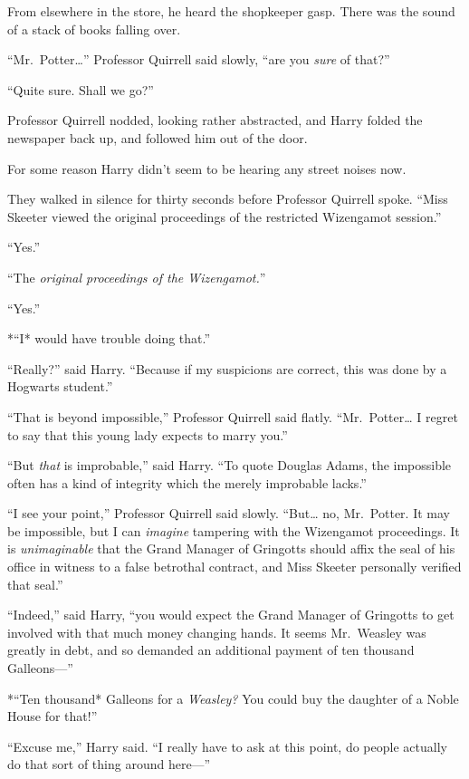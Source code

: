 From elsewhere in the store, he heard the shopkeeper gasp. There was the
sound of a stack of books falling over.

``Mr.~Potter\ldots{}'' Professor Quirrell said slowly, ``are you
\emph{sure} of that?''

``Quite sure. Shall we go?''

Professor Quirrell nodded, looking rather abstracted, and Harry folded
the newspaper back up, and followed him out of the door.

For some reason Harry didn't seem to be hearing any street noises now.

They walked in silence for thirty seconds before Professor Quirrell
spoke. ``Miss Skeeter viewed the original proceedings of the restricted
Wizengamot session.''

``Yes.''

``The \emph{original proceedings of the Wizengamot.}''

``Yes.''

*``I* would have trouble doing that.''

``Really?'' said Harry. ``Because if my suspicions are correct, this was
done by a Hogwarts student.''

``That is beyond impossible,'' Professor Quirrell said flatly.
``Mr.~Potter\ldots{} I regret to say that this young lady expects to
marry you.''

``But \emph{that} is improbable,'' said Harry. ``To quote Douglas Adams,
the impossible often has a kind of integrity which the merely improbable
lacks.''

``I see your point,'' Professor Quirrell said slowly. ``But\ldots{} no,
Mr.~Potter. It may be impossible, but I can \emph{imagine} tampering
with the Wizengamot proceedings. It is \emph{unimaginable} that the
Grand Manager of Gringotts should affix the seal of his office in
witness to a false betrothal contract, and Miss Skeeter personally
verified that seal.''

``Indeed,'' said Harry, ``you would expect the Grand Manager of
Gringotts to get involved with that much money changing hands. It seems
Mr.~Weasley was greatly in debt, and so demanded an additional payment
of ten thousand Galleons---''

*``Ten thousand* Galleons for a \emph{Weasley?} You could buy the
daughter of a Noble House for that!''

``Excuse me,'' Harry said. ``I really have to ask at this point, do
people actually do that sort of thing around here---''

